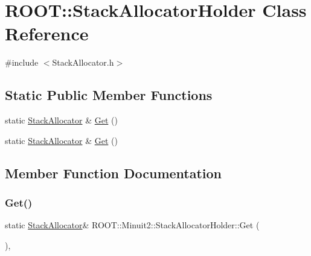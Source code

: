 \hypertarget{classROOT_1_1Minuit2_1_1StackAllocatorHolder}{}\section{R\+O\+OT\+:\+:Stack\+Allocator\+Holder Class Reference}
\label{classROOT_1_1Minuit2_1_1StackAllocatorHolder}


{\ttfamily \#include $<$Stack\+Allocator.\+h$>$}

\subsection*{Static Public Member Functions}
\begin{DoxyCompactItemize}
\item 
static \mbox{\hyperlink{classROOT_1_1Minuit2_1_1StackAllocator}{Stack\+Allocator}} \& \mbox{\hyperlink{classROOT_1_1Minuit2_1_1StackAllocatorHolder_ae380b3ed5065e114b12ac61207542466}{Get}} ()
\item 
static \mbox{\hyperlink{classROOT_1_1Minuit2_1_1StackAllocator}{Stack\+Allocator}} \& \mbox{\hyperlink{classROOT_1_1Minuit2_1_1StackAllocatorHolder_ae380b3ed5065e114b12ac61207542466}{Get}} ()
\end{DoxyCompactItemize}


\subsection{Member Function Documentation}
\mbox{\label{classROOT_1_1Minuit2_1_1StackAllocatorHolder_ae380b3ed5065e114b12ac61207542466}} 
\subsubsection{\texorpdfstring{Get()}{Get()}\hspace{0.1cm}{\footnotesize\ttfamily [1/2]}}
{\footnotesize\ttfamily static \mbox{\hyperlink{classROOT_1_1Minuit2_1_1StackAllocator}{Stack\+Allocator}}\& R\+O\+O\+T\+::\+Minuit2\+::\+Stack\+Allocator\+Holder\+::\+Get (\begin{DoxyParamCaption}{ }\end{DoxyParamCaption})\hspace{0.3cm}{\ttfamily [inline]}, {\ttfamily [static]}}

